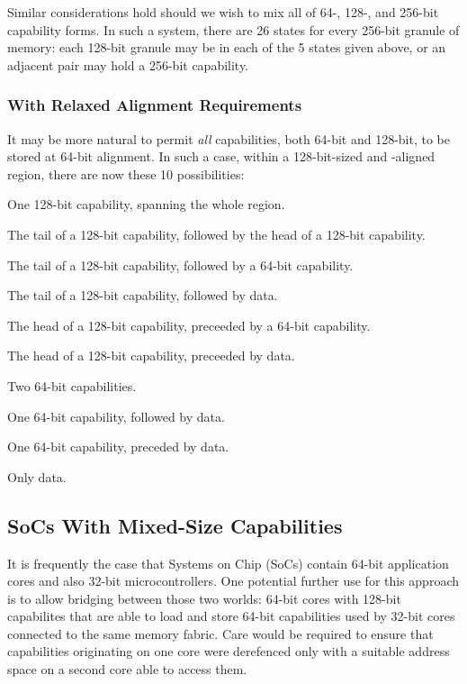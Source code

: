Similar considerations hold should we wish to mix all of 64-, 128-, and
256-bit capability forms.  In such a system, there are 26 states for every
256-bit granule of memory: each 128-bit granule may be in each of the 5
states given above, or an adjacent pair may hold a 256-bit capability.

\subsubsection{With Relaxed Alignment Requirements} %

It may be more natural to permit \emph{all} capabilities, both 64-bit and
128-bit, to be stored at 64-bit alignment.  In such a case, within a
128-bit-sized and -aligned region, there are now these 10 possibilities:
%
\begin{inenum}
%
  \item One 128-bit capability, spanning the whole region.
%
  \item The tail of a 128-bit capability, followed by the head of a 128-bit capability.
%
  \item The tail of a 128-bit capability, followed by a 64-bit capability.
%
  \item The tail of a 128-bit capability, followed by data.
%
  \item The head of a 128-bit capability, preceeded by a 64-bit capability.
%
  \item The head of a 128-bit capability, preceeded by data.
%
  \item Two 64-bit capabilities.
%
  \item One 64-bit capability, followed by data.
%
  \item One 64-bit capability, preceded by data.
%
  \item Only data.
%
\end{inenum}


\subsection{SoCs With Mixed-Size Capabilities} %

It is frequently the case that Systems on Chip (SoCs) contain 64-bit
application cores and also 32-bit microcontrollers.
One potential further use for this approach is to allow bridging between those
two worlds: 64-bit cores with 128-bit capabilites that are able to load and
store 64-bit capabilities used by 32-bit cores connected to the same memory
fabric.
Care would be required to ensure that capabilities originating on one core
were derefenced only with a suitable address space on a second core able to
access them.

